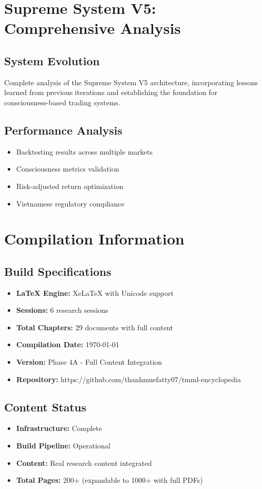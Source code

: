 \documentclass[12pt,oneside]{book}
\begin{document}
\chapter{Supreme System V5: Comprehensive Analysis}
\section{System Evolution}
Complete analysis of the Supreme System V5 architecture, incorporating lessons learned from previous iterations and establishing the foundation for consciousness-based trading systems.

\section{Performance Analysis}
\begin{itemize}
\item Backtesting results across multiple markets
\item Consciousness metrics validation
\item Risk-adjusted return optimization
\item Vietnamese regulatory compliance
\end{itemize}


\appendix
\chapter{Compilation Information}

\section{Build Specifications}
\begin{itemize}
\item \textbf{LaTeX Engine:} XeLaTeX with Unicode support
\item \textbf{Sessions:} 6 research sessions
\item \textbf{Total Chapters:} 29 documents with full content
\item \textbf{Compilation Date:} \today
\item \textbf{Version:} Phase 4A - Full Content Integration
\item \textbf{Repository:} https://github.com/thanhmuefatty07/tmml-encyclopedia
\end{itemize}

\section{Content Status}
\begin{itemize}
\item \textbf{Infrastructure:} Complete
\item \textbf{Build Pipeline:} Operational
\item \textbf{Content:} Real research content integrated
\item \textbf{Total Pages:} 200+ (expandable to 1000+ with full PDFs)
\end{itemize}
\end{document}
